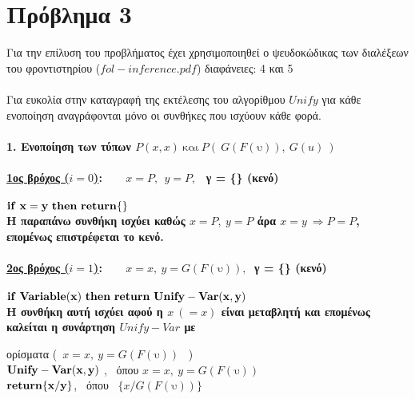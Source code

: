 \documentclass[10pt]{article}
\begin{document}
\section*{Πρόβλημα 3}
\vspace{5mm}
Για την επίλυση του προβλήματος έχει χρησιμοποιηθεί ο ψευδοκώδικας των διαλέξεων του φροντιστηρίου ($fol-inference.pdf$) διαφάνειες: 4 και 5 \\ \\
Για ευκολία στην καταγραφή της εκτέλεσης του αλγορίθμου $Unify$ για κάθε ενοποίηση αναγράφονται μόνο οι συνθήκες που ισχύουν κάθε φορά. \\ \\
\bf 1. \normalfont Ενοποίηση των τύπων $P(x,x) \  \text{και} \ P( \ G(F(\text{υ})), \  G(u) \ )$ \\ \\

\underline{1ος βρόχος ($i = 0$)}: \ \ \  $x = P, \ \   y = P, \ \ $ γ = \{\} (κενό)  \\ \\

\hspace{5mm}  $\bf if \ x = y \  then \  return \{\}$ \\

\hspace{5mm} Η παραπάνω συνθήκη ισχύει καθώς  $x = P ,\  y = P$ άρα  $x = y \ \Rightarrow 
 P = P$, επομένως επιστρέφεται το κενό. \\ \\

 \underline{2ος βρόχος ($i = 1$)}: \ \ \  $x = x ,\ y = G(F(\text{υ})), \ $ γ = \{\} (κενό) \\ \\
 
 \hspace{5mm} $\bf if \ Variable(x) \ then \ return \ Unify-Var(x, y)$\\

\hspace{5mm} Η συνθήκη αυτή ισχύει αφού η $x \ (=x)$ είναι μεταβλητή και επομένως καλείται η συνάρτηση $Unify-Var$ με

\hspace{5mm} ορίσματα (\ $x=x, \  y=G(F(\text{υ}))$ \ ) \\ 

\hspace{5mm} $\bf Unify-Var(x,y)$ , \ όπου  $x = x , \  y = G(F(\text{υ}))$ \\

\hspace{10mm} $ \bf return \{x/y\}$, \ όπου \  $\{x/ G(F(\text{υ}))\}$ \\ 
\end{document}
